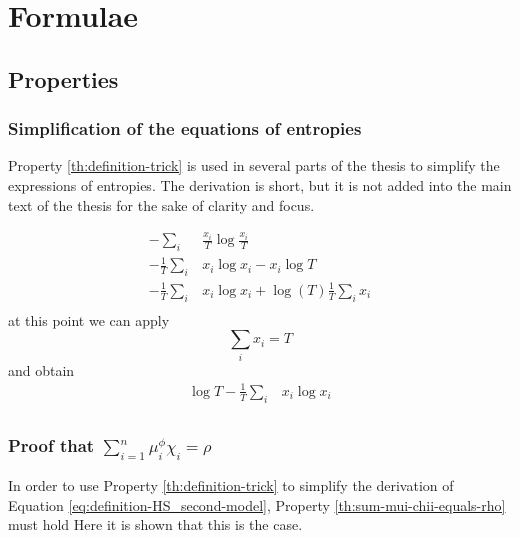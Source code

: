 \chapter{Formulae}
\label{cha:app_formulae}


\section{Properties}

\subsection{Simplification of the equations of entropies}
\label{sec:app_formulae_trick}

Property \ref{th:definition-trick} is used in several parts of the thesis to simplify the expressions of entropies.
The derivation is short, but it is not added into the main text of the thesis for the sake of clarity and focus.

\begin{align*}
              -\sum_i & \frac{x_i}{T} \log\frac{x_i}{T} \\
  -\frac{1}{T} \sum_i & x_i \log x_i - x_i \log T \\
  -\frac{1}{T} \sum_i & x_i \log x_i + \log(T) \frac{1}{T} \sum_i x_i \\
\end{align*}
at this point we can apply
\begin{equation*}
  \sum_i x_i = T
\end{equation*}
and obtain
\begin{align*}
  \log T - \frac{1}{T} \sum_i & x_i \log x_i\\
\end{align*}

\subsection{Proof that $\sum_{i=1}^n \mu_i^\phi \chi_i = \rho$}
\label{sec:app_formulae_proof-sum-HS_second-model}

In order to use Property \ref{th:definition-trick} to simplify the derivation of Equation \eqref{eq:definition-HS_second-model}, Property \ref{th:sum-mui-chii-equals-rho} must hold
Here it is shown that this is the case.

